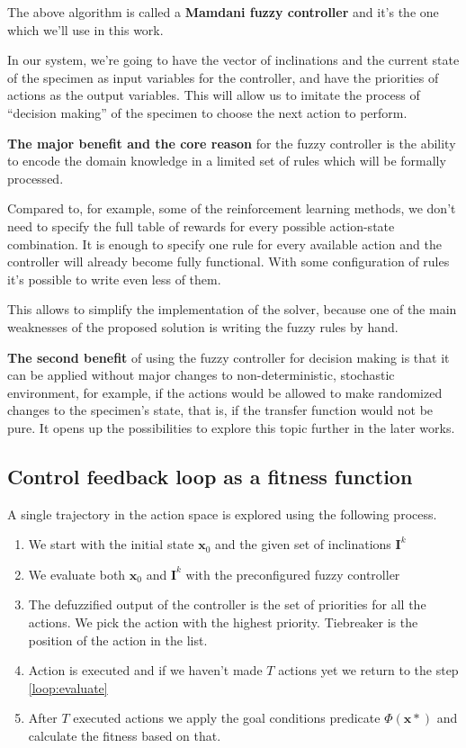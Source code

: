 \documentclass[12pt, a4paper]{article}
\begin{document}
  The above algorithm is called a \textbf{Mamdani fuzzy controller} and it's the one which we'll use in this work.

  In our system, we're going to have the vector of inclinations and the current state of the specimen as input variables for the controller,
  and have the priorities of actions as the output variables.
  This will allow us to imitate the process of ``decision making'' of the specimen to choose the next action to perform.

	\textbf{The major benefit and the core reason} for the fuzzy controller is the ability to encode the domain knowledge in a limited set of rules which will be formally processed.

	Compared to, for example, some of the reinforcement learning methods, we don't need to specify the full table of rewards for every possible action-state combination.
	It is enough to specify one rule for every available action and the controller will already become fully functional.
	With some configuration of rules it's possible to write even less of them.

	This allows to simplify the implementation of the solver, because one of the main weaknesses of the proposed solution is writing the fuzzy rules by hand.

  \textbf{The second benefit} of using the fuzzy controller for decision making is that it can be applied without major changes to non-deterministic, stochastic environment,
  for example, if the actions would be allowed to make randomized changes to the specimen's state, that is, if the transfer function would not be pure.
  It opens up the possibilities to explore this topic further in the later works.

	\subsection{Control feedback loop as a fitness function}\label{fitness}

	A single trajectory in the action space is explored using the following process.

	\begin{enumerate}
		\item We start with the initial state $\mathbf{x}_0$ and the given set of inclinations $\mathbf{I}^k$
		\item\label{loop:evaluate} We evaluate both $\mathbf{x}_0$ and $\mathbf{I}^k$ with the preconfigured fuzzy controller
		\item The defuzzified output of the controller is the set of priorities for all the  actions. We pick the action with the highest priority. Tiebreaker is the position of the action in the list.
		\item Action is executed and if we haven't made $T$ actions yet we return to the step \ref{loop:evaluate}
		\item After $T$ executed actions we apply the goal conditions predicate $\Phi(\mathbf{x}*)$ and calculate the fitness based on that.
	\end{enumerate}
\end{document}
